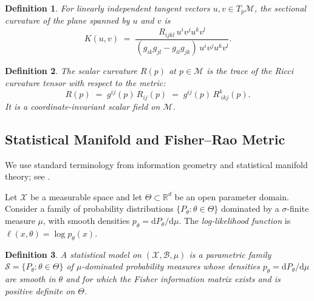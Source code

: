 \documentclass[a4paper,fleqn]{cas-dc}
\newtheorem{definition}{Definition}
\newcommand{\R}{\mathbb{R}}
\newcommand{\calM}{\mathcal{M}}
\begin{document}
\begin{definition}%
  \label{def:sectional_curvature}
  For linearly independent tangent vectors $u,v\in T_p\calM$, the
  \emph{sectional curvature} of the plane spanned by $u$ and $v$ is
  \begin{equation}
    K(u,v) \;=\;
    \frac{R_{ijkl}\,u^i v^j u^k v^l}
         {(g_{ik}g_{jl}-g_{il}g_{jk})\,u^i v^j u^k v^l}.
    \label{eq:sectional_curvature}
  \end{equation}
\end{definition}

\begin{definition}%
  \label{def:scalar_curvature}
  The \emph{scalar curvature} $R(p)$ at $p \in \calM$ is the trace of the
  Ricci curvature tensor with respect to the metric:
  \begin{equation}
    R(p) \;=\; g^{ij}(p)\, R_{ij}(p)
    \;=\; g^{ij}(p)\, R^{k}_{\;ikj}(p).
    \label{eq:scalar_curvature}
  \end{equation}
  It is a coordinate-invariant scalar field on $\calM$.
\end{definition}

\subsection{Statistical Manifold and Fisher--Rao Metric}

We use standard terminology from information geometry and statistical
manifold theory; see \cite{lauritzen1987statistical,amari2000methods,
amari2012differential}.

Let $\mathcal{X}$ be a measurable space and let $\Theta\subset\R^d$ be an open
parameter domain. Consider a family of probability distributions
$\{P_\theta : \theta\in\Theta\}$ dominated by a $\sigma$-finite measure
$\mu$, with smooth densities $p_\theta = \mathrm{d}P_\theta/\mathrm{d}\mu$.
The \emph{log-likelihood function} is
$\ell(x,\theta)=\log p_\theta(x)$.

\begin{definition}%
  \label{def:statistical_model}
  A \emph{statistical model} on $(\mathcal{X},\mathcal{B},\mu)$ is a
  parametric family $\mathcal{S}=\{P_\theta:\theta\in\Theta\}$ of
  $\mu$-dominated probability measures whose densities
  $p_\theta=\mathrm{d}P_\theta/\mathrm{d}\mu$ are smooth in $\theta$ and
  for which the Fisher information matrix exists and is positive definite
  on $\Theta$.
\end{definition}
\end{document}
